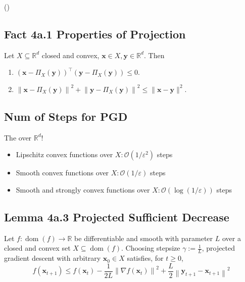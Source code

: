 ()




\subsection*{Fact 4a.1 Properties of Projection}
Let $X \subseteq \mathbb{R}^{d}$ closed and convex, $\mathbf{x} \in X, \mathbf{y} \in \mathbb{R}^{d}$. Then
\begin{enumerate}[label = (\roman*), leftmargin=*]
    \item $\left(\mathbf{x}-\Pi_{X}(\mathbf{y})\right)^{\top}\left(\mathbf{y}-\Pi_{X}(\mathbf{y})\right) \leq 0$.
    \item $\left\|\mathbf{x}-\Pi_{X}(\mathbf{y})\right\|^{2}+\left\|\mathbf{y}-\Pi_{X}(\mathbf{y})\right\|^{2} \leq\|\mathbf{x}-\mathbf{y}\|^{2}$.
\end{enumerate}


\subsection*{Num of Steps for PGD}
The  over $\mathbb{R}^{d}$!
\begin{itemize}[leftmargin=*]
    \item Lipschitz convex functions over $X: \mathcal{O}\left(1 / \varepsilon^{2}\right)$ steps
    \item Smooth convex functions over $X: \mathcal{O}(1 / \varepsilon)$ steps
    \item Smooth and strongly convex functions over $X: \mathcal{O}(\log (1 / \varepsilon))$ steps
\end{itemize}


\subsection*{Lemma 4a.3 Projected Sufficient Decrease}
Let $f: \operatorname{dom}(f) \rightarrow \mathbb{R}$ be differentiable and smooth with parameter $L$ over a closed and convex set $X \subseteq \operatorname{dom}(f)$. Choosing stepsize $\gamma:=\frac{1}{L}$, projected gradient descent with arbitrary $\mathbf{x}_{0} \in X$ satisfies, for $t \geq 0$,
$$
f\left(\mathbf{x}_{t+1}\right) \leq f\left(\mathbf{x}_{t}\right)-\frac{1}{2 L}\left\|\nabla f\left(\mathbf{x}_{t}\right)\right\|^{2}+\frac{L}{2}\left\|\mathbf{y}_{t+1}-\mathbf{x}_{t+1}\right\|^{2}
$$



